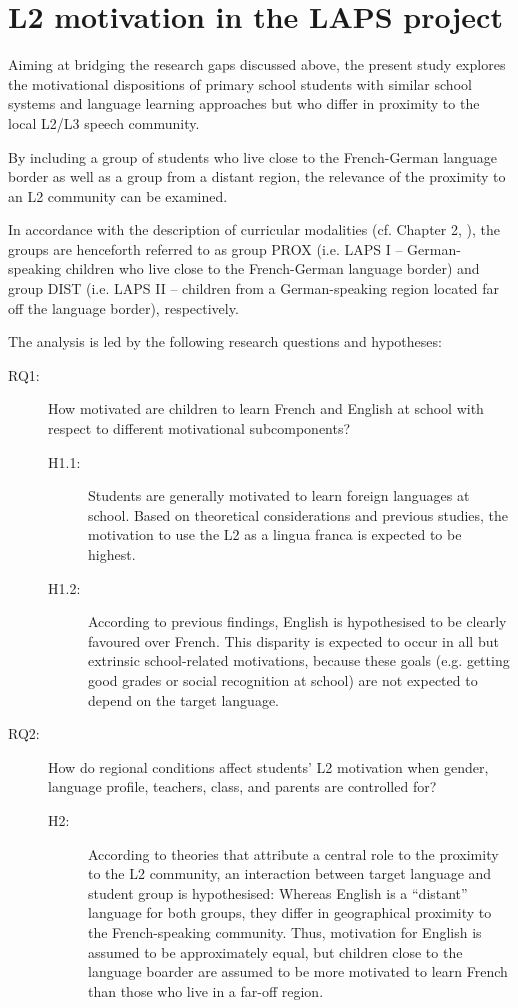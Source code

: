 \documentclass[output=paper]{langsci/langscibook}
\begin{document}
\section{L2 motivation in the LAPS project}\label{sec:07:4}

Aiming at bridging the research gaps discussed above, the present study explores the motivational dispositions of primary school students with similar school systems and language learning approaches but who differ in proximity to the local L2/L3 speech community. 

By including a group of students who live close to the French-German language border as well as a group from a distant region, the relevance of the proximity to an L2 community can be examined. 

In accordance with the description of curricular modalities (cf. Chapter 2, ), the groups are henceforth referred to as group PROX (i.e. LAPS I – German-speaking children who live close to the French-German language border) and group DIST (i.e. LAPS II – children from a German-speaking region located far off the language border), respectively.

The analysis is led by the following research questions and hypotheses:

\begin{description}
\item[RQ1:] How motivated are children to learn French and English at school with respect to different motivational subcomponents?
    \begin{description}
    \item[H1.1:] Students are generally motivated to learn foreign languages at school. Based on theoretical considerations and previous studies, the motivation to use the L2 as a lingua franca is expected to be highest.
    \item[H1.2:] According to previous findings, English is hypothesised to be clearly favoured over French. This disparity is expected to occur in all but extrinsic school-related motivations, because these goals (e.g. getting good grades or social recognition at school) are not expected to depend on the target language.
    \end{description}

\item[RQ2:] How do regional conditions affect students’ L2 motivation when gender, language profile, teachers, class, and parents are controlled for?
   \begin{description}
   \item[H2:] According to theories that attribute a central role to the proximity to the L2 community, an interaction between target language and student group is hypothesised: Whereas English is a ``distant'' language for both groups, they differ in geographical proximity to the French-speaking community. Thus, motivation for English is assumed to be approximately equal, but children close to the language boarder are assumed to be more motivated to learn French than those who live in a far-off region.
   \end{description}
\end{description}
\end{document}
